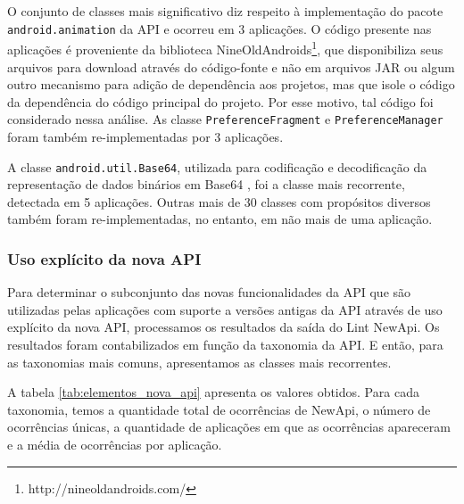 O conjunto de classes mais significativo diz respeito à implementação do pacote 
\texttt{android.animation} da API e ocorreu em 3 aplicações. O código presente
nas aplicações é proveniente da biblioteca NineOldAndroids\footnote{http://nineoldandroids.com/},
que disponibiliza seus arquivos para
download através do código-fonte e não em arquivos JAR ou algum outro mecanismo
para adição de dependência aos projetos, mas que isole o código da dependência
do código principal do projeto. Por esse motivo, tal código foi considerado
nessa análise. As classe \texttt{PreferenceFragment} e \texttt{PreferenceManager}
foram também re-implementadas por 3 aplicações.

A classe \texttt{android.util.Base64}, utilizada para codificação e decodificação
da representação de dados binários em Base64 \cite{RFC4648}, foi a classe mais
recorrente, detectada em 5 aplicações. Outras mais de 30 classes com propósitos 
diversos também foram re-implementadas, no entanto, em não mais de uma aplicação.

\subsubsection{Uso explícito da nova API}

Para determinar o subconjunto das novas funcionalidades da API que são utilizadas
pelas aplicações com suporte a versões antigas da API através de uso explícito da
nova API, processamos os resultados da saída do Lint NewApi. Os resultados foram
contabilizados em função da taxonomia da API. E então, para as taxonomias mais
comuns, apresentamos as classes mais recorrentes.

A tabela \ref{tab:elementos_nova_api} apresenta os valores obtidos. Para cada
taxonomia, temos a quantidade total de ocorrências de NewApi, o número de
ocorrências únicas, a quantidade de aplicações em que as ocorrências apareceram
e a média de ocorrências por aplicação.

